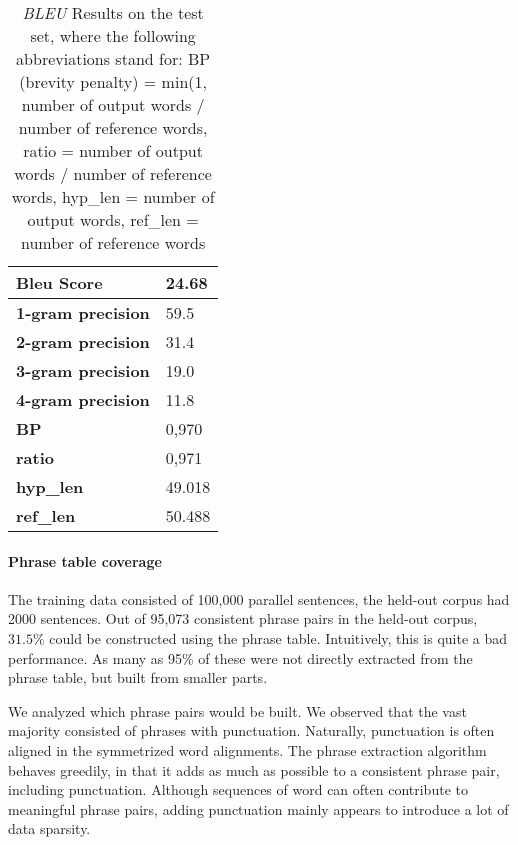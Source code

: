 \documentclass[11pt]{article}
\begin{document}
\begin{table}[h]
\centering
\begin{tabular}{ l l }
  \hline \hline
  \textbf{Bleu Score} & 24.68 \\
  \hline \hline
  \textbf{1-gram precision} & 59.5 \\
  \textbf{2-gram precision} & 31.4 \\
  \textbf{3-gram precision} & 19.0 \\
  \textbf{4-gram precision} & 11.8 \\
  \hline \hline
  \textbf{BP} & 0,970 \\
  \textbf{ratio} & 0,971 \\
  \textbf{hyp\_len} & 49.018 \\
  \textbf{ref\_len} & 50.488 \\
  \hline \hline
\end{tabular}
\caption{\textit{BLEU} Results on the test set, where the following abbreviations stand for: BP (brevity penalty) = min(1, number of output words / number of reference words, ratio = number of output words / number of reference words, hyp\_len = number of output words, ref\_len = number of reference words}
\label{bleuresults}
\end{table}


\paragraph{Phrase table coverage}
The training data consisted of 100,000 parallel sentences, the held-out corpus had 2000 sentences. Out of 95,073 consistent phrase pairs in the held-out corpus, $31.5\%$ could be constructed using the phrase table. Intuitively, this is quite a bad performance. As many as 95\% of these were not directly extracted from the phrase table, but built from smaller parts.

We analyzed which phrase pairs would be built. We observed that the vast majority consisted of phrases with punctuation. Naturally, punctuation is often aligned in the symmetrized word alignments. The phrase extraction algorithm behaves greedily, in that it adds as much as possible to a consistent phrase pair, including punctuation. Although sequences of word can often contribute to meaningful phrase pairs, adding punctuation mainly appears to introduce a lot of data sparsity. 

\end{document}
